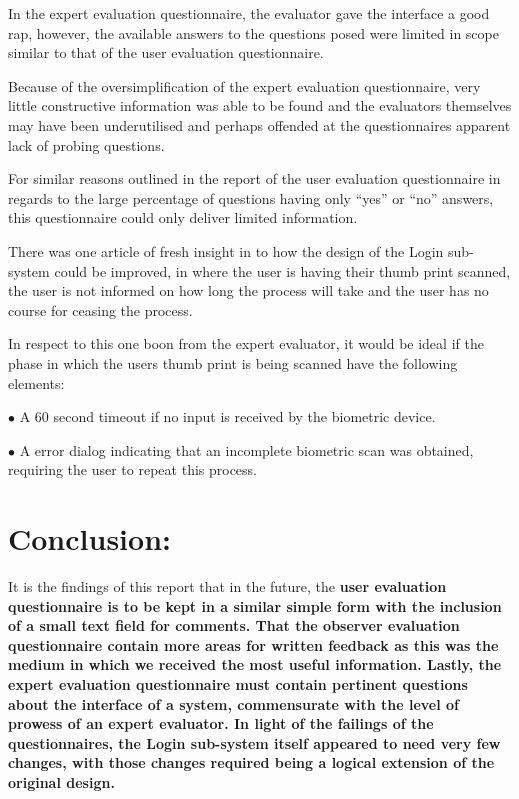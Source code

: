 In the expert evaluation questionnaire, the evaluator gave the interface a good
rap, however, the available answers to the questions posed were limited in
scope similar to that of the user evaluation questionnaire.

Because of the oversimplification of the expert evaluation questionnaire, very
little constructive information was able to be found and the evaluators
themselves may have been underutilised and perhaps offended at the
questionnaires apparent lack of probing questions.

For similar reasons outlined in the report of the user evaluation questionnaire
in regards to the large percentage of questions having only ``yes'' or ``no''
answers, this questionnaire could only deliver limited information.

There was one article of fresh insight in to how the design of the Login
sub-system could be improved, in where the user is having their thumb print
scanned, the user is not informed on how long the process will take and the user
has no course for ceasing the process.

In respect to this one boon from the expert evaluator, it would be ideal if
the phase in which the users thumb print is being scanned have the following
elements:

\item{$\bullet$}	A 60 second timeout if no input is received by the
			biometric device.
\item{$\bullet$}	A error dialog indicating that an incomplete biometric
			scan was obtained, requiring the user to repeat this
			process.

\section {
	Conclusion:
}

It is the findings of this report that in the future, the \bf user \rm
evaluation questionnaire is to be kept in a similar simple form with the
inclusion of a small text field for comments. That the \bf observer \rm
evaluation questionnaire contain more areas for written feedback as this was
the medium in which we received the most useful information. Lastly, the
\bf expert \rm evaluation questionnaire must contain pertinent questions about
the interface of a system, commensurate with the level of prowess of an expert
evaluator. In light of the failings of the questionnaires, the Login sub-system
itself appeared to need very few changes, with those changes required being a
logical extension of the original design.

\bye
